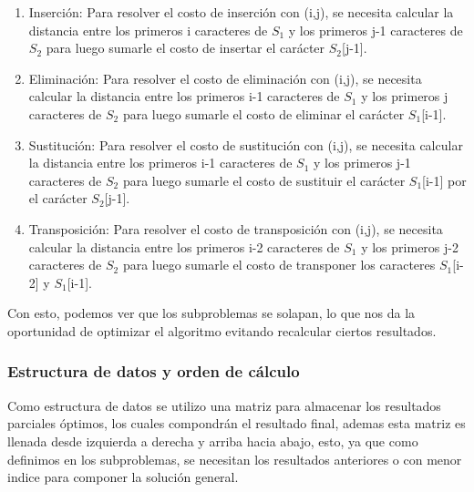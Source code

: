 \begin{enumerate}
    \item Inserción: Para resolver el costo de inserción con (i,j), se necesita
    calcular la distancia entre los primeros i caracteres de $S_1$ y los primeros
    j-1 caracteres de $S_2$ para luego sumarle el costo de insertar el carácter
    $S_2$[j-1].
    \item Eliminación: Para resolver el costo de eliminación con (i,j), se necesita
    calcular la distancia entre los primeros i-1 caracteres de $S_1$ y los primeros
    j caracteres de $S_2$ para luego sumarle el costo de eliminar el carácter
    $S_1$[i-1].
    \item Sustitución: Para resolver el costo de sustitución con (i,j), se necesita
    calcular la distancia entre los primeros i-1 caracteres de $S_1$ y los primeros
    j-1 caracteres de $S_2$ para luego sumarle el costo de sustituir el carácter
    $S_1$[i-1] por el carácter $S_2$[j-1].
    \item Transposición: Para resolver el costo de transposición con (i,j), se necesita
    calcular la distancia entre los primeros i-2 caracteres de $S_1$ y los primeros
    j-2 caracteres de $S_2$ para luego sumarle el costo de transponer los caracteres
    $S_1$[i-2] y $S_1$[i-1].

\end{enumerate}

Con esto, podemos ver que los subproblemas se solapan, lo que nos da la oportunidad
de optimizar el algoritmo evitando recalcular ciertos resultados.

\subsubsection{Estructura de datos y orden de cálculo}

Como estructura de datos se utilizo una matriz para almacenar los resultados
parciales óptimos, los cuales compondrán el resultado final, ademas esta matriz 
es llenada desde izquierda a derecha y arriba hacia abajo, esto, ya que como definimos
en los subproblemas, se necesitan los resultados anteriores o con menor indice para componer
la solución general.